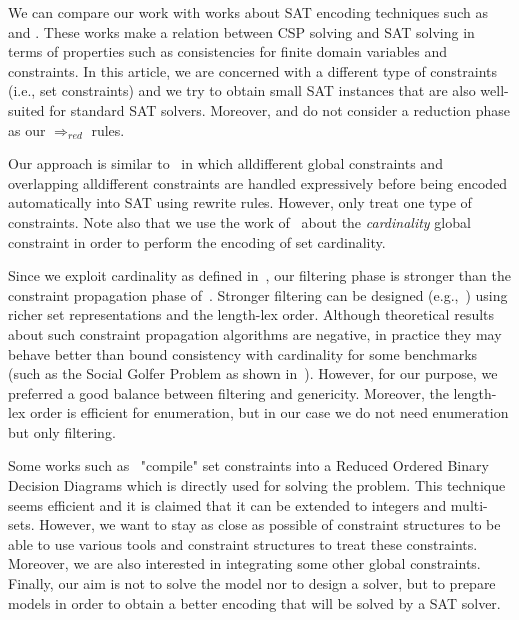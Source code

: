 \documentclass[3p,authoryear,times]{elsarticle}
\newcommand{\rmin}[0]{{\Rightarrow_{red}}}
\begin{document}
\medskip

We can compare our work with works about SAT encoding techniques such as~\cite{bacchusCP2007} and \cite{bessiereSAT2003}. These works make a relation between CSP solving and SAT solving in terms of properties such as consistencies for finite domain variables and constraints. In this article, we are concerned with a different type of constraints (i.e., set constraints) and we try to obtain small SAT instances that are also well-suited for standard SAT solvers. Moreover, \cite{bacchusCP2007} and \cite{bessiereSAT2003} do not consider a reduction phase as our $\rmin$ rules.


Our approach is similar to~\cite{micai2009} in which alldifferent global constraints and overlapping alldifferent constraints are handled expressively before being encoded automatically into SAT using rewrite rules. However, \cite{micai2009} only treat one type of constraints. Note also that we use the work of~\cite{Bailleux03} about the \textit{cardinality} global constraint in order to perform the encoding of set cardinality. 

Since we exploit cardinality as defined in~\cite{azevedoThesis}, our filtering phase is stronger than the constraint propagation phase of~\cite{ConjuntoILPS94}.
Stronger filtering can be designed (e.g.,~\cite{yip11}) using richer set representations and the length-lex order. Although theoretical results about such constraint propagation algorithms are negative, in practice they may behave better than bound consistency with cardinality for some benchmarks (such as the Social Golfer Problem as shown in~\cite{yip11}). 
However, for our purpose, we preferred a good balance between filtering and genericity. Moreover, the length-lex order is efficient for enumeration,  but in our case we do not need enumeration but only filtering.


Some works such as~\cite{hawkins05} "compile" set constraints into a Reduced Ordered Binary Decision Diagrams which is directly used for solving the problem. This technique seems efficient and it is claimed that it can be extended to integers and multi-sets. However, we want to stay as close as possible of constraint structures to be able to use various tools and constraint structures to treat these constraints. Moreover, we are also interested in integrating some other global constraints. Finally, our aim is not to solve the model nor to design a solver, but to prepare models in order to obtain a better encoding that will be solved by a SAT solver.
\end{document}
